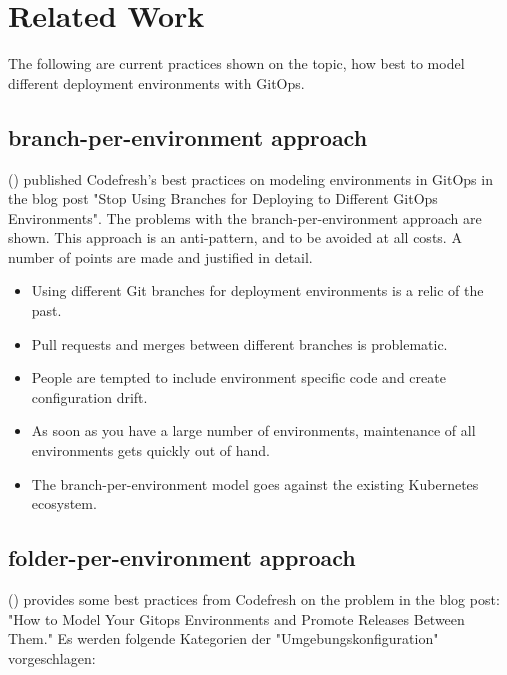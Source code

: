 \chapter{Related Work}

The following are current practices
shown on the topic,
how best to model different deployment environments with GitOps.


\section{branch-per-environment approach}

\citeauthor{codefreshStopUsingBranchesGitOpsEnvironments} (\citeyear{codefreshStopUsingBranchesGitOpsEnvironments})
published Codefresh's best practices on modeling environments in GitOps 
in the blog post "Stop Using Branches for Deploying to Different GitOps Environments".
The problems with the branch-per-environment approach are shown.
This approach is an anti-pattern,
and to be avoided at all costs.
A number of points are made and justified in detail.

\begin{itemize}
	\item Using different Git branches for deployment environments is a relic of the past.
	\item Pull requests and merges between different branches is problematic.
	\item People are tempted to include environment specific code and create configuration drift.
	\item As soon as you have a large number of environments, maintenance of all environments gets quickly out of hand.
	\item The branch-per-environment model goes against the existing Kubernetes ecosystem.
\end{itemize}

\noindent
\autocite{codefreshStopUsingBranchesGitOpsEnvironments}

\section{folder-per-environment approach}

\citeauthor{codefreshHowToModelGitOpsEnvironmentsAndPromote} (\citeyear{codefreshHowToModelGitOpsEnvironmentsAndPromote})
provides some best practices from Codefresh on the problem in the blog post: "How to Model Your Gitops Environments and Promote Releases Between Them."
%
Es werden folgende Kategorien der "Umgebungskonfiguration" vorgeschlagen:

